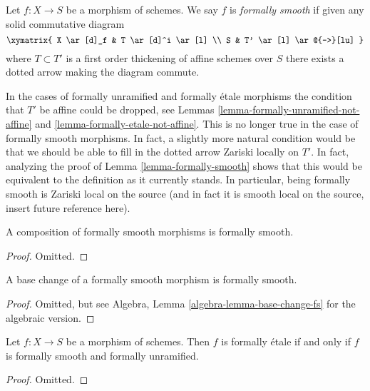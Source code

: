 \begin{definition}
\label{definition-formally-smooth}
Let $f : X \to S$ be a morphism of schemes.
We say $f$ is {\it formally smooth} if given any solid commutative diagram
$$
\xymatrix{
X \ar[d]_f & T \ar[d]^i \ar[l] \\
S & T' \ar[l] \ar@{-->}[lu]
}
$$
where $T \subset T'$ is a first order thickening of affine schemes over $S$
there exists a dotted arrow making the diagram commute.
\end{definition}

\noindent
In the cases of formally unramified and formally \'etale morphisms
the condition that $T'$ be affine could be dropped, see
Lemmas \ref{lemma-formally-unramified-not-affine} and
\ref{lemma-formally-etale-not-affine}.
This is no longer true in the case of formally smooth morphisms.
In fact, a slightly more natural condition would be that we should be
able to fill in the dotted arrow Zariski locally on $T'$.
In fact, analyzing the proof of
Lemma \ref{lemma-formally-smooth}
shows that this would be equivalent to the definition as it currently
stands. In particular, being formally smooth is
Zariski local on the source (and in fact it is smooth local on the source,
insert future reference here).

\begin{lemma}
\label{lemma-composition-formally-smooth}
A composition of formally smooth morphisms is formally smooth.
\end{lemma}

\begin{proof}
Omitted.
\end{proof}

\begin{lemma}
\label{lemma-base-change-formally-smooth}
A base change of a formally smooth morphism is formally smooth.
\end{lemma}

\begin{proof}
Omitted, but see Algebra, Lemma \ref{algebra-lemma-base-change-fs}
for the algebraic version.
\end{proof}

\begin{lemma}
\label{lemma-formally-etale-unramified-smooth}
Let $f : X \to S$ be a morphism of schemes.
Then $f$ is formally \'etale if and only if
$f$ is formally smooth and formally unramified.
\end{lemma}

\begin{proof}
Omitted.
\end{proof}

